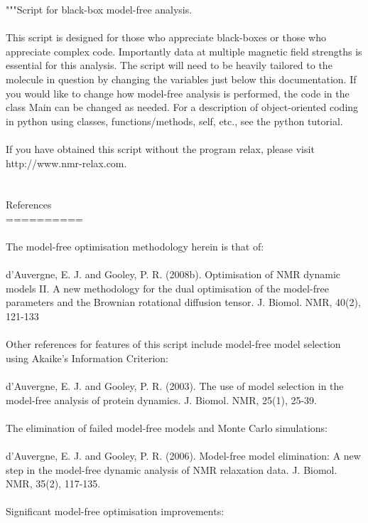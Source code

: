 \begin{htmlonly}
\begin{htmlonly}
\begin{exampleenv}
"""Script for black-box model-free analysis. \\
 \\
This script is designed for those who appreciate black-boxes or those who appreciate complex code.  Importantly data at multiple magnetic field strengths is essential for this analysis.  The script will need to be heavily tailored to the molecule in question by changing the variables just below this documentation.  If you would like to change how model-free analysis is performed, the code in the class Main can be changed as needed.  For a description of object-oriented coding in python using classes, functions/methods, self, etc., see the python tutorial. \\
 \\
If you have obtained this script without the program relax, please visit http://www.nmr-relax.com. \\
 \\
 \\
References \\
========== \\
 \\
The model-free optimisation methodology herein is that of: \\
 \\
    d'Auvergne, E. J. and Gooley, P. R. (2008b). Optimisation of NMR dynamic models II. A new methodology for the dual optimisation of the model-free parameters and the Brownian rotational diffusion tensor. J. Biomol. NMR, 40(2), 121-133 \\
 \\
Other references for features of this script include model-free model selection using Akaike's Information Criterion: \\
 \\
    d'Auvergne, E. J. and Gooley, P. R. (2003). The use of model selection in the model-free analysis of protein dynamics. J. Biomol. NMR, 25(1), 25-39. \\
 \\
The elimination of failed model-free models and Monte Carlo simulations: \\
 \\
    d'Auvergne, E. J. and Gooley, P. R. (2006). Model-free model elimination: A new step in the model-free dynamic analysis of NMR relaxation data. J. Biomol. NMR, 35(2), 117-135. \\
 \\
Significant model-free optimisation improvements: \\

\end{exampleenv}
\end{htmlonly}
\end{htmlonly}
